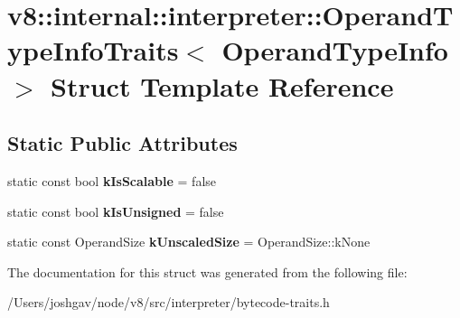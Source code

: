 \hypertarget{structv8_1_1internal_1_1interpreter_1_1_operand_type_info_traits}{}\section{v8\+:\+:internal\+:\+:interpreter\+:\+:Operand\+Type\+Info\+Traits$<$ Operand\+Type\+Info $>$ Struct Template Reference}
\label{structv8_1_1internal_1_1interpreter_1_1_operand_type_info_traits}
\subsection*{Static Public Attributes}
\begin{DoxyCompactItemize}
\item 
static const bool {\bfseries k\+Is\+Scalable} = false\hypertarget{structv8_1_1internal_1_1interpreter_1_1_operand_type_info_traits_a9e1370644b7ba0b6003ea27d7c2bfba3}{}\label{structv8_1_1internal_1_1interpreter_1_1_operand_type_info_traits_a9e1370644b7ba0b6003ea27d7c2bfba3}

\item 
static const bool {\bfseries k\+Is\+Unsigned} = false\hypertarget{structv8_1_1internal_1_1interpreter_1_1_operand_type_info_traits_a932fbcbd3d53b4a107088e2527ca9947}{}\label{structv8_1_1internal_1_1interpreter_1_1_operand_type_info_traits_a932fbcbd3d53b4a107088e2527ca9947}

\item 
static const Operand\+Size {\bfseries k\+Unscaled\+Size} = Operand\+Size\+::k\+None\hypertarget{structv8_1_1internal_1_1interpreter_1_1_operand_type_info_traits_a0e718fe3790611613bf986b1b019211d}{}\label{structv8_1_1internal_1_1interpreter_1_1_operand_type_info_traits_a0e718fe3790611613bf986b1b019211d}

\end{DoxyCompactItemize}


The documentation for this struct was generated from the following file\+:\begin{DoxyCompactItemize}
\item 
/\+Users/joshgav/node/v8/src/interpreter/bytecode-\/traits.\+h\end{DoxyCompactItemize}
